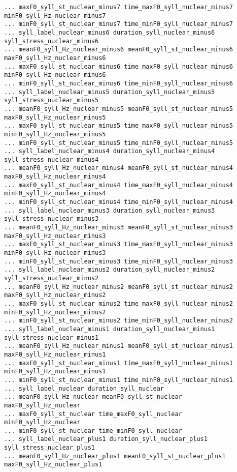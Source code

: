 \begin{Verbatim}[fontsize=\tiny]
... maxF0_syll_st_nuclear_minus7 time_maxF0_syll_nuclear_minus7 minF0_syll_Hz_nuclear_minus7 
... minF0_syll_st_nuclear_minus7 time_minF0_syll_nuclear_minus7
... syll_label_nuclear_minus6 duration_syll_nuclear_minus6 syll_stress_nuclear_minus6 
... meanF0_syll_Hz_nuclear_minus6 meanF0_syll_st_nuclear_minus6 maxF0_syll_Hz_nuclear_minus6 
... maxF0_syll_st_nuclear_minus6 time_maxF0_syll_nuclear_minus6 minF0_syll_Hz_nuclear_minus6 
... minF0_syll_st_nuclear_minus6 time_minF0_syll_nuclear_minus6
... syll_label_nuclear_minus5 duration_syll_nuclear_minus5 syll_stress_nuclear_minus5 
... meanF0_syll_Hz_nuclear_minus5 meanF0_syll_st_nuclear_minus5 maxF0_syll_Hz_nuclear_minus5 
... maxF0_syll_st_nuclear_minus5 time_maxF0_syll_nuclear_minus5 minF0_syll_Hz_nuclear_minus5 
... minF0_syll_st_nuclear_minus5 time_minF0_syll_nuclear_minus5
... syll_label_nuclear_minus4 duration_syll_nuclear_minus4 syll_stress_nuclear_minus4 
... meanF0_syll_Hz_nuclear_minus4 meanF0_syll_st_nuclear_minus4 maxF0_syll_Hz_nuclear_minus4 
... maxF0_syll_st_nuclear_minus4 time_maxF0_syll_nuclear_minus4 minF0_syll_Hz_nuclear_minus4 
... minF0_syll_st_nuclear_minus4 time_minF0_syll_nuclear_minus4
... syll_label_nuclear_minus3 duration_syll_nuclear_minus3 syll_stress_nuclear_minus3 
... meanF0_syll_Hz_nuclear_minus3 meanF0_syll_st_nuclear_minus3 maxF0_syll_Hz_nuclear_minus3 
... maxF0_syll_st_nuclear_minus3 time_maxF0_syll_nuclear_minus3 minF0_syll_Hz_nuclear_minus3 
... minF0_syll_st_nuclear_minus3 time_minF0_syll_nuclear_minus3
... syll_label_nuclear_minus2 duration_syll_nuclear_minus2 syll_stress_nuclear_minus2 
... meanF0_syll_Hz_nuclear_minus2 meanF0_syll_st_nuclear_minus2 maxF0_syll_Hz_nuclear_minus2 
... maxF0_syll_st_nuclear_minus2 time_maxF0_syll_nuclear_minus2 minF0_syll_Hz_nuclear_minus2 
... minF0_syll_st_nuclear_minus2 time_minF0_syll_nuclear_minus2
... syll_label_nuclear_minus1 duration_syll_nuclear_minus1 syll_stress_nuclear_minus1 
... meanF0_syll_Hz_nuclear_minus1 meanF0_syll_st_nuclear_minus1 maxF0_syll_Hz_nuclear_minus1 
... maxF0_syll_st_nuclear_minus1 time_maxF0_syll_nuclear_minus1 minF0_syll_Hz_nuclear_minus1 
... minF0_syll_st_nuclear_minus1 time_minF0_syll_nuclear_minus1
... syll_label_nuclear duration_syll_nuclear 
... meanF0_syll_Hz_nuclear meanF0_syll_st_nuclear maxF0_syll_Hz_nuclear 
... maxF0_syll_st_nuclear time_maxF0_syll_nuclear minF0_syll_Hz_nuclear 
... minF0_syll_st_nuclear time_minF0_syll_nuclear
... syll_label_nuclear_plus1 duration_syll_nuclear_plus1 syll_stress_nuclear_plus1 
... meanF0_syll_Hz_nuclear_plus1 meanF0_syll_st_nuclear_plus1 maxF0_syll_Hz_nuclear_plus1 

\end{Verbatim}
